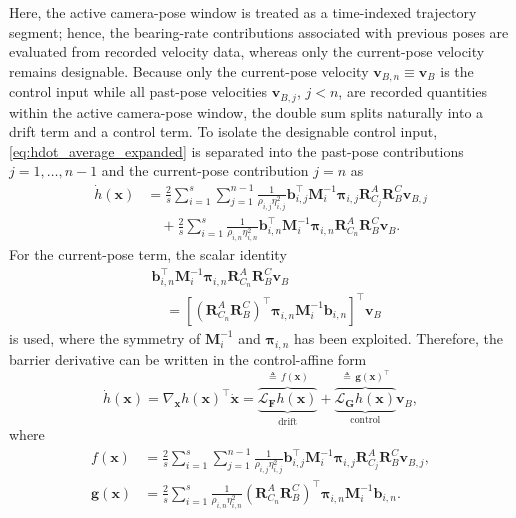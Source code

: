 \documentclass[journal]{IEEEtran}
\begin{document}
Here, the active camera-pose window is treated as a time-indexed trajectory segment; hence, the bearing-rate contributions associated with previous poses are evaluated from recorded velocity data, whereas only the current-pose velocity remains designable. Because only the current-pose velocity $\bm{v}_{B,n}\equiv\bm{v}_{B}$ is the control input while all past-pose velocities $\bm{v}_{B,j}$, $j<n$, are recorded quantities within the active camera-pose window, the double sum splits naturally into a drift term and a control term. To isolate the designable control input, \eqref{eq:hdot_average_expanded} is separated into the past-pose contributions $j=1,\ldots,n-1$ and the current-pose contribution $j=n$ as
\begin{align}
  \dot{h}(\bm{x})
  &=
  \frac{2}{s}\sum_{i=1}^{s}\sum_{j=1}^{n-1}
  \frac{1}{\rho_{i,j}\eta_{i,j}^{2}}
  \bm{b}_{i,j}^{\top}\bm{M}_{i}^{-1}\bm{\pi}_{i,j}
  \bm{R}_{C_j}^{A}\bm{R}_{B}^{C}\bm{v}_{B,j}
  \nonumber\\
  &\quad+
  \frac{2}{s}\sum_{i=1}^{s}
  \frac{1}{\rho_{i,n}\eta_{i,n}^{2}}
  \bm{b}_{i,n}^{\top}\bm{M}_{i}^{-1}\bm{\pi}_{i,n}
  \bm{R}_{C_n}^{A}\bm{R}_{B}^{C}\bm{v}_{B}.
  \label{eq:hdot_split_current_past}
\end{align}
For the current-pose term, the scalar identity
\begin{align}
  &\bm{b}_{i,n}^{\top}\bm{M}_{i}^{-1}\bm{\pi}_{i,n}
  \bm{R}_{C_n}^{A}\bm{R}_{B}^{C}\bm{v}_{B} \nonumber\\
  &\quad =
  \left[
  \left(\bm{R}_{C_n}^{A}\bm{R}_{B}^{C}\right)^{\top}
  \bm{\pi}_{i,n}\bm{M}_{i}^{-1}\bm{b}_{i,n}
  \right]^{\top}
  \bm{v}_{B}
  \label{eq:current_term_scalar_identity}
\end{align}
is used, where the symmetry of $\bm{M}_{i}^{-1}$ and $\bm{\pi}_{i,n}$ has been exploited. Therefore, the barrier derivative can be written in the control-affine form
\begin{equation}
  \dot{h}(\bm{x})
  =
  \nabla_{\bm{x}} h(\bm{x})^{\top}\dot{\bm{x}}
  =
  \underbrace{
  \overbrace{\mathcal{L}_{\bm{F}}h(\bm{x})}^{\triangleq\, f(\bm{x})}
  }_{\text{drift}}
  +
  \underbrace{
  \overbrace{\mathcal{L}_{\bm{G}}h(\bm{x})}^{\triangleq\, \bm{g}(\bm{x})^{\top}}
  }_{\text{control}}
  \bm{v}_{B},
  \label{eq:hdot_drift_control}
\end{equation}
where
\begin{align}
  f(\bm{x})
  &= \frac{2}{s}\sum_{i=1}^{s}\sum_{j=1}^{n-1}
  \frac{1}{\rho_{i,j}\eta_{i,j}^{2}}
  \bm{b}_{i,j}^{\top}\bm{M}_{i}^{-1}\bm{\pi}_{i,j}
  \bm{R}_{C_j}^{A}\bm{R}_{B}^{C}\bm{v}_{B,j},
  \label{eq:drift_def}\\[6pt]
  \bm{g}(\bm{x})
  &= \frac{2}{s}\sum_{i=1}^{s}
  \frac{1}{\rho_{i,n}\eta_{i,n}^{2}}
  \left(\bm{R}_{C_n}^{A}\bm{R}_{B}^{C}\right)^{\top}
  \bm{\pi}_{i,n}\bm{M}_{i}^{-1}\bm{b}_{i,n}.
  \label{eq:g_def}
\end{align}
\end{document}
